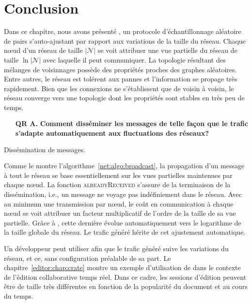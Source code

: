 
\section{Conclusion}
\label{net:sec:conclusion}

Dans ce chapitre, nous avons présenté \SPRAY, un protocole d'échantillonnage
aléatoire de pairs s'auto-ajustant par rapport aux variations de la taille du
réseau. Chaque nœud d'un réseau de taille $|\mathcal{N}|$ se voit attribuer une
vue partielle du réseau de taille $\ln |\mathcal{N}|$ avec laquelle il peut
communiquer. La topologie résultant des mélanges de voisinnages possède des
propriétés proches des graphes aléatoires. Entre autres, le réseau est tolérent
aux pannes et l'information se propage très rapidement. Bien que les connexions
ne s'établissent que de voisin à voisin, le réseau converge vers une topologie
dont les propriétés sont stables en très peu de temps.

\begin{itemize}
\item [\textbf{QR A.}] \textbf{Comment disséminer les messages de telle façon
    que le trafic s'adapte automatiquement aux fluctuations des réseaux?}
\end{itemize}


\begin{algorithm}[h]
  
  \caption{\label{net:algo:broadcast} Dissémination de messages.}
\end{algorithm}

Comme le montre l'algorithme~\ref{net:algo:broadcast}, la propagation d'un
message à tout le réseau se base essentiellement sur les vues partielles
maintenues par chaque nœud. La fonction \textsc{alreadyReceived} s'assure de la
terminaison de la dissémination, i.e., un message ne voyage pas indéfiniement
dans le réseau. Avec au minimum une transmission par nœud, le coût en
communication à chaque nœud se voit attribuer un facteur multiplicatif de
l'ordre de la taille de sa vue partielle. Grâce à \SPRAY, cette dernière évolue
automatiquement vers le logarithme de la taille globale du réseau. Le trafic
généré hérite de cet ajustement automatique.

Un développeur peut utiliser \SPRAY afin que le trafic généré suive les
variations du réseau, et ce, sans configuration préalable de sa part. Le
chapitre~\ref{editor:chap:crate} montre un exemple d'utilisation de \SPRAY dans
le contexte de l'édition collaborative temps réel. Dans ce cadre, les sessions
d'édition peuvent être de taille très différentes en fonction de la popularité
du document et au cours du temps. 

